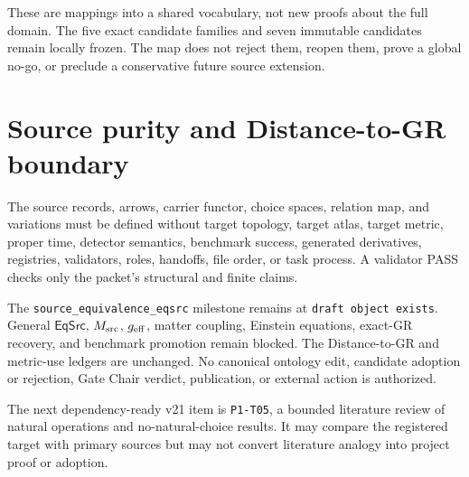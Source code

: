 \documentclass[11pt]{article}
\begin{document}
These are mappings into a shared vocabulary, not new proofs about the full
domain. The five exact candidate families and seven immutable candidates
remain locally frozen. The map does not reject them, reopen them, prove a
global no-go, or preclude a conservative future source extension.

\section{Source purity and Distance-to-GR boundary}

The source records, arrows, carrier functor, choice spaces, relation map, and
variations must be defined without target topology, target atlas, target
metric, proper time, detector semantics, benchmark success, generated
derivatives, registries, validators, roles, handoffs, file order, or task
process. A validator PASS checks only the packet's structural and finite
claims.

The \texttt{source\_equivalence\_eqsrc} milestone remains at
\texttt{draft object exists}. General \(\mathsf{EqSrc}\), \(M_{\rm src}\),
\(g_{\rm eff}\), matter coupling, Einstein equations, exact-GR recovery, and
benchmark promotion remain blocked. The Distance-to-GR and metric-use
ledgers are unchanged. No canonical ontology edit, candidate adoption or
rejection, Gate Chair verdict, publication, or external action is authorized.

The next dependency-ready v21 item is \texttt{P1-T05}, a bounded literature
review of natural operations and no-natural-choice results. It may compare
the registered target with primary sources but may not convert literature
analogy into project proof or adoption.
\end{document}
